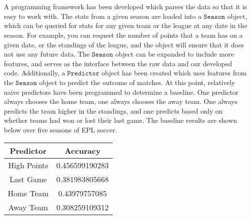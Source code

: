 \documentclass[conference]{IEEEtran}
\begin{document}
%

\section{}
A programming framework has been developed which parses the data so that it is easy to work with. The stats from a given season are loaded into a $\mathtt{Season}$ object, which can be queried for stats for any given team or the league at any date in the season. For example, you can request the number of points that a team has on a given date, or the standings of the league, and the object will ensure that it does not use any future data. The $\mathtt{Season}$ object can be expanded to include more features, and serves as the interface between the raw data and our developed code. Additionally, a $\mathtt{Predictor}$ object has been created which uses features from the $\mathtt{Season}$ object to predict the outcome of matches. At this point, relatively naive predictors have been programmed to determine a baseline. One predictor always chooses the home team, one always chooses the away team. One always predicts the team higher in the standings, and one predicts based only on whether teams had won or lost their last game. The baseline results are shown below over five seasons of EPL soccer.

\begin{center}
  \begin{tabular}{@{} cc @{}}
    \hline
    Predictor & Accuracy \\ 
    \hline
High Points & 0.456599190283 \\ 
    Last Game & 0.381983805668\\ 
    Home Team & 0.43979757085 \\ 
    Away Team & 0.308259109312\\ 
    \hline
  \end{tabular}
\end{center}
\end{document}

